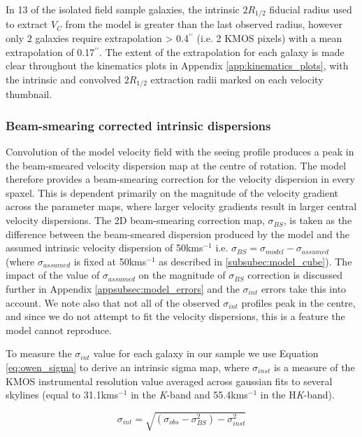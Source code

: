 \documentclass[fleqn,usenatbib]{mn2e}
\begin{document}
In 13 of the isolated field sample galaxies, the intrinsic $2R_{1/2}$ fiducial radius used to extract $V_{C}$ from the model is greater than the last observed radius, however only 2 galaxies require extrapolation > 0.4$^{\prime\prime}$ (i.e. 2 KMOS pixels) with a mean extrapolation of 0.17$^{\prime\prime}$.
The extent of the extrapolation for each galaxy is made clear throughout the kinematics plots in Appendix \ref{app:kinematics_plots}, with the intrinsic and convolved $2R_{1/2}$ extraction radii marked on each velocity thumbnail.

\subsubsection{Beam-smearing corrected intrinsic dispersions}\label{subsubsec:beam_smearing_corrected_dispersions}
Convolution of the model velocity field with the seeing profile produces a peak in the beam-smeared velocity dispersion map at the centre of rotation.
The model therefore provides a beam-smearing correction for the velocity dispersion in every spaxel.
This is dependent primarily on the magnitude of the velocity gradient across the parameter maps, where larger velocity gradients result in larger central velocity dispersions.
The 2D beam-smearing correction map, $\sigma_{BS}$, is taken as the difference between the beam-smeared dispersion produced by the model and the assumed intrinsic velocity dispersion of 50kms$^{-1}$ i.e. $\sigma_{BS} = \sigma_{model} - \sigma_{assumed}$ (where $\sigma_{assumed}$ is fixed at 50kms$^{-1}$ as described in \cref{subsubec:model_cube}).
The impact of the value of $\sigma_{assumed}$ on the magnitude of $\sigma_{BS}$ correction is discussed further in Appendix \ref{appsubsec:model_errors} and the $\sigma_{int}$ errors take this into account.
We note also that not all of the observed $\sigma_{int}$ profiles peak in the centre, and since we do not attempt to fit the velocity dispersions, this is a feature the model cannot reproduce. 

To measure the $\sigma_{int}$ value for each galaxy in our sample we use Equation \ref{eq:owen_sigma} to derive an intrinsic sigma map, where $\sigma_{inst}$ is a measure of the KMOS instrumental resolution value averaged across gaussian fits to several skylines (equal to 31.1kms$^{-1}$ in the {\it K}-band and 55.4kms$^{-1}$ in the H{\it K}-band).

\begin{equation}\label{eq:owen_sigma}
\sigma_{int} = \sqrt{\left(\sigma_{obs} - \sigma_{BS}^{2}\right) - \sigma_{inst}^{2}}
\end{equation}
\end{document}
